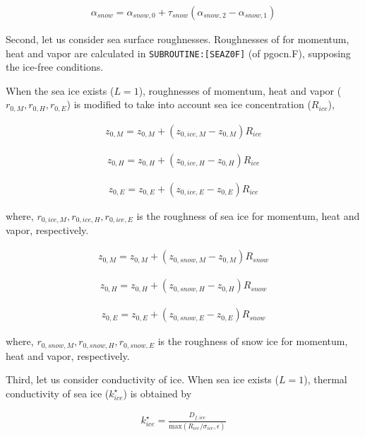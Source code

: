 \begin{eqnarray}
    \alpha_{snow} = \alpha_{snow,0} + \tau_{snow}(\alpha_{snow,2}-\alpha_{snow,1})
\end{eqnarray}

Second, let us consider sea surface roughnesses. Roughnesses of for
momentum, heat and vapor are calculated in
\texttt{SUBROUTINE:{[}SEAZ0F{]}} (of pgocn.F), supposing the ice-free
conditions.

When the sea ice exists (\(L=1\)), roughnesses of momentum, heat and
vapor (\(r_{0,M},r_{0,H},r_{0,E}\)) is modified to take into account sea
ice concentration (\(R_{ice}\)),

\begin{eqnarray}
    z_{0,M} = z_{0,M} + ( z_{0,ice,M} - z_{0,M})  R_{ice}
\end{eqnarray}

\begin{eqnarray}
    z_{0,H} = z_{0,H} + ( z_{0,ice,H} - z_{0,H})  R_{ice}
\end{eqnarray}

\begin{eqnarray}
    z_{0,E} = z_{0,E} + ( z_{0,ice,E} - z_{0,E})  R_{ice}
\end{eqnarray}

where, \(r_{0,ice,M},r_{0,ice,H},r_{0,ice,E}\) is the roughness of sea
ice for momentum, heat and vapor, respectively.

\begin{eqnarray}
    z_{0,M} = z_{0,M} + ( z_{0,snow,M} - z_{0,M})  R_{snow}
\end{eqnarray}

\begin{eqnarray}
    z_{0,H} = z_{0,H} + ( z_{0,snow,H} - z_{0,H})  R_{snow}
\end{eqnarray}

\begin{eqnarray}
    z_{0,E} = z_{0,E} + ( z_{0,snow,E} - z_{0,E})  R_{snow}
\end{eqnarray}

where, \(r_{0,snow,M},r_{0,snow,H},r_{0,snow,E}\) is the roughness of
snow ice for momentum, heat and vapor, respectively.

Third, let us consider conductivity of ice. When sea ice exists
(\(L=1\)), thermal conductivity of sea ice (\(k_{ice}^\star\)) is
obtained by

\begin{eqnarray}
k_{ice}^\star = \frac{D_{f,ice}}{\mathrm{max}(R_{ice}/\sigma_{ice}, \epsilon)}
\end{eqnarray}

